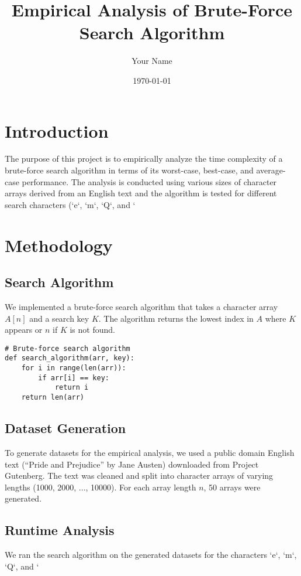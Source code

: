 \documentclass{article}
\title{Empirical Analysis of Brute-Force Search Algorithm}
\author{Your Name}
\date{\today}
\begin{document}
\maketitle

\tableofcontents

\newpage

\section{Introduction}
The purpose of this project is to empirically analyze the time complexity of a brute-force search algorithm in terms of its worst-case, best-case, and average-case performance. The analysis is conducted using various sizes of character arrays derived from an English text and the algorithm is tested for different search characters (`e`, `m`, `Q`, and `%

\section{Methodology}

\subsection{Search Algorithm}
We implemented a brute-force search algorithm that takes a character array \( A[n] \) and a search key \( K \). The algorithm returns the lowest index in \( A \) where \( K \) appears or \( n \) if \( K \) is not found. 

\begin{verbatim}
# Brute-force search algorithm
def search_algorithm(arr, key):
    for i in range(len(arr)):
        if arr[i] == key:
            return i
    return len(arr)
\end{verbatim}

\subsection{Dataset Generation}
To generate datasets for the empirical analysis, we used a public domain English text (``Pride and Prejudice'' by Jane Austen) downloaded from Project Gutenberg. The text was cleaned and split into character arrays of varying lengths (1000, 2000, ..., 10000). For each array length \( n \), 50 arrays were generated.

\subsection{Runtime Analysis}
We ran the search algorithm on the generated datasets for the characters `e`, `m`, `Q`, and `%
\end{document}
